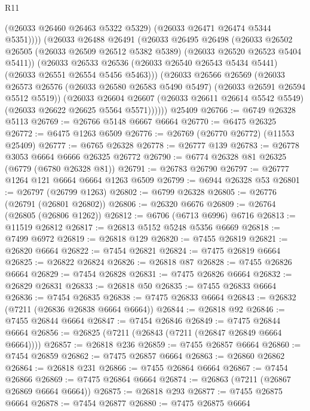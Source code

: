 \begin{lexlean}{R11}
\begin{coremodule}
              (@26033 @26460 @26463 @5322 @5329)
              (@26033 @26471 @26474 @5344 @5351))))
        (@26033
          @26488
          @26491
          (@26033
            @26495
            @26498
            (@26033
              @26502
              @26505
              (@26033 @26509 @26512 @5382 @5389)
              (@26033 @26520 @26523 @5404 @5411))
            (@26033
              @26533
              @26536
              (@26033 @26540 @26543 @5434 @5441)
              (@26033 @26551 @26554 @5456 @5463)))
          (@26033
            @26566
            @26569
            (@26033
              @26573
              @26576
              (@26033 @26580 @26583 @5490 @5497)
              (@26033 @26591 @26594 @5512 @5519))
            (@26033
              @26604
              @26607
              (@26033 @26611 @26614 @5542 @5549)
              (@26033 @26622 @26625 @5564 @5571))))))
    @25409
@26766 := @6749 @26328 @5113
@26769 := @26766 @5148 @6667 @6664
@26770 := @6475 @26325
@26772 := @6475 @1263 @6509
@26776 := @26769 (@26770 @26772) (@11553 @25409)
@26777 := @6765 @26328
@26778 := @26777 @139
@26783 := @26778 @3053 @6664 @6666 @26325 @26772
@26790 := @6774 @26328 @81 @26325 (@6779 (@6780 @26328 @81))
@26791 := @26783 @26790
@26797 := @26777 @1264 @121 @6664 @6664 @1263 @6509
@26799 := @6944 @26328 @53
@26801 := @26797 (@26799 @1263)
@26802 := @6799 @26328
@26805 := @26776 (@26791 (@26801 @26802))
@26806 := @26320 @6676
@26809 := @26764 (@26805 (@26806 @1262))
@26812 := @6706 (@6713 @6996) @6716
@26813 := @11519 @26812
@26817 := @26813 @5152 @5248 @5356 @6669
@26818 := @7499 @6972
@26819 := @26818 @129
@26820 := @7455 @26819
@26821 := @26820 @6664
@26822 := @7454 @26821
@26824 := @7475 @26819 @6664
@26825 := @26822 @26824
@26826 := @26818 @87
@26828 := @7455 @26826 @6664
@26829 := @7454 @26828
@26831 := @7475 @26826 @6664
@26832 := @26829 @26831
@26833 := @26818 @50
@26835 := @7455 @26833 @6664
@26836 := @7454 @26835
@26838 := @7475 @26833 @6664
@26843 := @26832 (@7211 (@26836 @26838 @6664 @6664))
@26844 := @26818 @92
@26846 := @7455 @26844 @6664
@26847 := @7454 @26846
@26849 := @7475 @26844 @6664
@26856 := @26825 (@7211 (@26843 (@7211 (@26847 @26849 @6664 @6664))))
@26857 := @26818 @236
@26859 := @7455 @26857 @6664
@26860 := @7454 @26859
@26862 := @7475 @26857 @6664
@26863 := @26860 @26862
@26864 := @26818 @231
@26866 := @7455 @26864 @6664
@26867 := @7454 @26866
@26869 := @7475 @26864 @6664
@26874 := @26863 (@7211 (@26867 @26869 @6664 @6664))
@26875 := @26818 @293
@26877 := @7455 @26875 @6664
@26878 := @7454 @26877
@26880 := @7475 @26875 @6664

\end{coremodule}
\end{lexlean}
